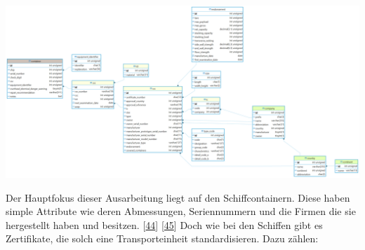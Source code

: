 \documentclass[
    headings=optiontotocandhead,%
    twoside,
    numbers=noenddot,%
    12pt, %
    titlepage, %
    parskip=full, %
    listof=leveldown, 
    numbers=noenddot, %
    a4paper,DIV=14,
    BCOR=15mm,
]{scrbook}
\let\origfigure=\figure
\let\endorigfigure=\endfigure
\renewenvironment{figure}[1][]{%
   \origfigure[H]
}{%
   \endorigfigure
}
\begin{document}
\begin{figure}
\centering
\includegraphics[width=1\textwidth,height=\textheight]{img/Schrempf/container-erd.png}
\caption{ERD der Containerdatenbank}
\end{figure}

Der Hauptfokus dieser Ausarbeitung liegt auf den Schiffcontainern. Diese
haben simple Attribute wie deren Abmessungen, Seriennummern und die
Firmen die sie hergestellt haben und besitzen.
{[}\protect\hyperlink{ref-bic-code}{44}{]}
{[}\protect\hyperlink{ref-icecargo}{45}{]} Doch wie bei den Schiffen
gibt es Zertifikate, die solch eine Transporteinheit standardisieren.
Dazu zählen:
\end{document}
